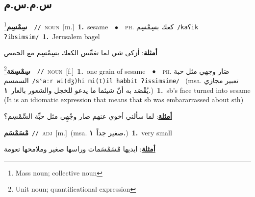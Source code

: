 \documentclass[10pt,a4paper,twoside]{article} %
\begin{document}
\begin{multicols}{2}
\vspace{-3mm}
\subsection*{\color{blue}\foreignlanguage{arabic}{س.م.س.م}\color{blue}{}} 

{\setlength\topsep{0pt}\textbf{\foreignlanguage{arabic}{سِمْسِم}}\footnote{Mass noun; collective noun}\ \ {\color{gray}\texttt{//}\color{black}}\ \textsc{noun}\ [m.]\ \textbf{1.}~sesame\ \ $\bullet$\ \ \textsc{ph.} \color{gray} \foreignlanguage{arabic}{كعك بسِمْسِم}\color{black}\ {\color{gray}\texttt{/{\sffamily kaʕik ʔibsimsim}/}\color{black}}\ \textbf{1.}~Jerusalem bagel\  \begin{flushright}\color{gray}\foreignlanguage{arabic}{\textbf{\underline{\foreignlanguage{arabic}{أمثلة}}}: أزكى شي لما تغمِّس الكعك بسِمْسِم مع الحمص}\end{flushright}\color{black}} \vspace{2mm}

{\setlength\topsep{0pt}\textbf{\foreignlanguage{arabic}{سِمْسِمَة}}\footnote{Unit noun; quantificational expression}\ \ {\color{gray}\texttt{//}\color{black}}\ \textsc{noun}\ [f.]\ \textbf{1.}~one grain of sesame\ \ $\bullet$\ \ \textsc{ph.} \color{gray} \foreignlanguage{arabic}{صَار وجهي مثل حبة السمسم}\color{black}\ {\color{gray}\texttt{/{\sffamily sˤaːr wi(dʒ)hi mi(t)il ħabbit ʔissimsime}/}\color{black}}\ \color{gray} (msa. \foreignlanguage{arabic}{تعبير مجازي يُقْصَد به أنّ شيئما ما يدعو للخجل والشعور بالعار}~\foreignlanguage{arabic}{\textbf{١.}})\color{black}\ \textbf{1.}~sb's face turned into sesame (It is an idiomatic expression that means that sb was embararrassed about sth)\  \begin{flushright}\color{gray}\foreignlanguage{arabic}{\textbf{\underline{\foreignlanguage{arabic}{أمثلة}}}: لما سألني أخوي عنهم صار وجْهِي مثل حبِّة السِّمْسِم؟}\end{flushright}\color{black}} \vspace{2mm}

{\setlength\topsep{0pt}\textbf{\foreignlanguage{arabic}{مْسَمْسَم}}\ {\color{gray}\texttt{//}\color{black}}\ \textsc{adj}\ [m.]\ \color{gray}(msa. \foreignlanguage{arabic}{صغير جداً}~\foreignlanguage{arabic}{\textbf{١.}})\color{black}\ \textbf{1.}~very small\  \begin{flushright}\color{gray}\foreignlanguage{arabic}{\textbf{\underline{\foreignlanguage{arabic}{أمثلة}}}: ايديها مْسَمْسَمات وراسها صغير وملامحها نعومة}\end{flushright}\color{black}} \vspace{2mm}


\end{multicols}
\end{document}
